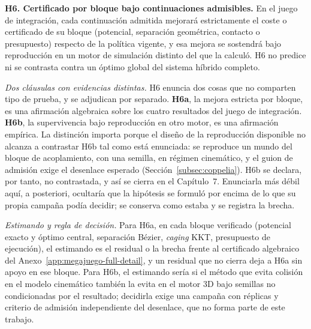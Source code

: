 \par\bigskip
\noindent\textbf{H6. Certificado por bloque bajo continuaciones admisibles.}
En el juego de integración, cada continuación admitida
mejorará estrictamente el coste o certificado de su bloque (potencial,
separación geométrica, contacto o presupuesto) respecto de la política
vigente, y esa mejora se sostendrá bajo reproducción en un motor de
simulación distinto del que la calculó. H6 no predice ni se contrasta contra
un óptimo global del sistema híbrido completo.

\medskip
\noindent\emph{Dos cláusulas con evidencias distintas.} H6 enuncia dos cosas
que no comparten tipo de prueba, y se adjudican por separado. \textbf{H6a}, la
mejora estricta por bloque, es una afirmación algebraica sobre los cuatro
resultados del juego de integración. \textbf{H6b}, la supervivencia bajo
reproducción en otro motor, es una afirmación empírica. La distinción importa
porque el diseño de la reproducción disponible no alcanza a contrastar H6b tal
como está enunciada: se reproduce un mundo del bloque de acoplamiento, con una
semilla, en régimen cinemático, y el guion de admisión exige el desenlace
esperado (Sección~\ref{subsec:coppelia}). H6b se declara, por tanto, no
contrastada, y así se cierra en el Capítulo~7. Enunciarla más débil aquí, a
posteriori, ocultaría que la hipótesis se formuló por encima de lo que su
propia campaña podía decidir; se conserva como estaba y se registra la brecha.

\medskip
\noindent\emph{Estimando y regla de decisión.} Para H6a, en cada bloque
verificado (potencial exacto y óptimo central, separación Bézier,
\emph{caging} KKT, presupuesto de ejecución), el estimando es el residual o la
brecha frente al certificado algebraico del
Anexo~\ref{app:megajuego-full-detail}, y un residual que no cierra deja a H6a
sin apoyo en ese bloque. Para H6b, el estimando sería si el método que evita
colisión en el modelo cinemático también la evita en el motor 3D bajo semillas
no condicionadas por el resultado; decidirla exige una campaña con réplicas y
criterio de admisión independiente del desenlace, que no forma parte de este
trabajo.
